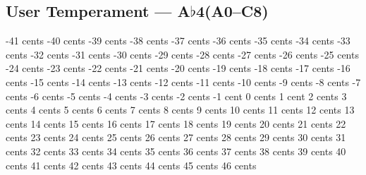 \subsection[User Temperament]{User Temperament --- \UiKey{\I}\UiKey{\SET}A$\flat$4(A0--C8)}
-41 cents
-40 cents
-39 cents
-38 cents
-37 cents
-36 cents
-35 cents
-34 cents
-33 cents
-32 cents
-31 cents
-30 cents
-29 cents
-28 cents
-27 cents
-26 cents
-25 cents
-24 cents
-23 cents
-22 cents
-21 cents
-20 cents
-19 cents
-18 cents
-17 cents
-16 cents
-15 cents
-14 cents
-13 cents
-12 cents
-11 cents
-10 cents
-9  cents
-8  cents
-7  cents
-6  cents
-5  cents
-4  cents
-3  cents
-2  cents
-1  cent
0   cents
1   cent
2   cents
3   cents
4   cents
5   cents
6   cents
7   cents
8   cents
9   cents
10  cents
11  cents
12  cents
13  cents
14  cents
15  cents
16  cents
17  cents
18  cents
19  cents
20  cents
21  cents
22  cents
23  cents
24  cents
25  cents
26  cents
27  cents
28  cents
29  cents
30  cents
31  cents
32  cents
33  cents
34  cents
35  cents
36  cents
37  cents
38  cents
39  cents
40  cents
41  cents
42  cents
43  cents
44  cents
45  cents
46  cents
